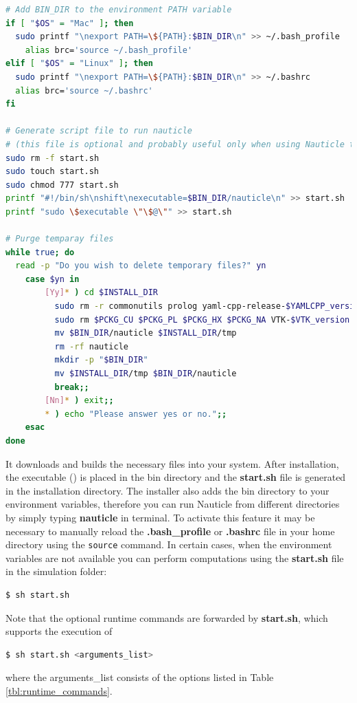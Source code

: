 \documentclass[a4paper,12pt,openany]{book}
\theoremstyle{break}
\begin{document}
\begin{example}{\installer{}}{}
\begin{lstlisting}[language=bash]
# Add BIN_DIR to the environment PATH variable
if [ "$OS" = "Mac" ]; then
  sudo printf "\nexport PATH=\${PATH}:$BIN_DIR\n" >> ~/.bash_profile
    alias brc='source ~/.bash_profile'
elif [ "$OS" = "Linux" ]; then
  sudo printf "\nexport PATH=\${PATH}:$BIN_DIR\n" >> ~/.bashrc
  alias brc='source ~/.bashrc'
fi

# Generate script file to run nauticle
# (this file is optional and probably useful only when using Nauticle through ssh)
sudo rm -f start.sh
sudo touch start.sh
sudo chmod 777 start.sh
printf "#!/bin/sh\nshift\nexecutable=$BIN_DIR/nauticle\n" >> start.sh
printf "sudo \$executable \"\$@\"" >> start.sh

# Purge temparay files
while true; do
  read -p "Do you wish to delete temporary files?" yn
    case $yn in
        [Yy]* ) cd $INSTALL_DIR
          sudo rm -r commonutils prolog yaml-cpp-release-$YAMLCPP_version
          sudo rm $PCKG_CU $PCKG_PL $PCKG_HX $PCKG_NA VTK-$VTK_version.zip
          mv $BIN_DIR/nauticle $INSTALL_DIR/tmp
          rm -rf nauticle
          mkdir -p "$BIN_DIR"
          mv $INSTALL_DIR/tmp $BIN_DIR/nauticle
          break;;
        [Nn]* ) exit;;
        * ) echo "Please answer yes or no.";;
    esac
done
\end{lstlisting}
\end{example}

It downloads and builds the necessary files into your system. After installation, the executable (\execname{}) is placed in the bin directory and the \textbf{start.sh} file is generated in the installation directory. The installer also adds the bin directory to your environment variables, therefore you can run Nauticle from different directories by simply typing \textbf{nauticle} in terminal. To activate this feature it may be necessary to manually reload the \textbf{.bash\_profile} or \textbf{.bashrc} file in your home directory using the \texttt{source} command.
In certain cases, when the environment variables are not available you can perform computations using the \textbf{start.sh} file in the simulation folder:
\begin{lstlisting}[language=bash]
  $ sh start.sh
\end{lstlisting}
Note that the optional runtime commands are forwarded by \textbf{start.sh}, which supports the execution of
\begin{lstlisting}[language=bash]
  $ sh start.sh <arguments_list>
\end{lstlisting}
where the arguments\_list consists of the options listed in Table \ref{tbl:runtime_commands}.
\end{document}
